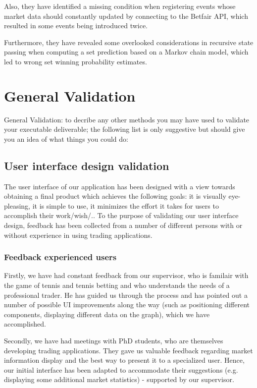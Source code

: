 \documentclass[10pt]{article}
\begin{document}
Also, they have identified a missing condition when registering events whose market data should constantly updated by connecting to the Betfair API, which resulted in some events being introduced twice.

Furthermore, they have revealed some overlooked considerations in recursive state passing when computing a set prediction based on a Markov chain model, which led to wrong set winning probability estimates. 

\section{General Validation}
General Validation: to decribe any other methods you may have used to validate your executable deliverable; the following list is only suggestive but should give you an idea of what things you could do:

\subsection{User interface design validation}

The user interface of our application has been designed with a view towards obtaining a final product which achieves the following goals: it is visually eye-pleasing, it is simple to use, it minimizes the effort it takes for users to accomplish their work/wish/..
To the purpose of validating our user interface design, feedback has been collected from a number of different persons with or without experience in using trading applications.

\subsubsection{Feedback experienced users}

Firstly, we have had constant feedback from our supervisor, who is familair with the game of tennis and tennis betting and who understands the needs of a professional trader. He has guided us through the process and has pointed out a number of possible UI improvements along the way (such as positioning different components, displaying different data on the graph), which we have accomplished.

Secondly, we have had meetings with PhD students, who are themselves developing trading applications. They gave us valuable feedback regarding market information display and the best way to present it to a specialized user. Hence, our initial interface has been adapted to accommodate their suggestions (e.g. displaying some additional market statistics) - supported by our supervisor.
\end{document}
